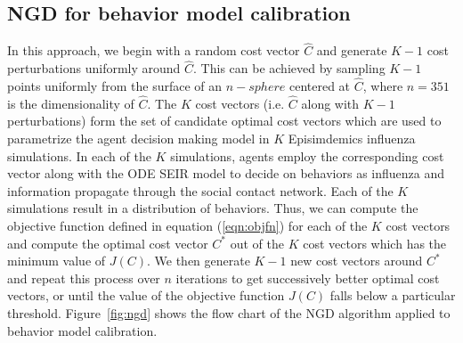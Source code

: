 \documentclass[doublespace,draft]{VTthesis}
\begin{document}
    \subsection{NGD for behavior model calibration} 
    In this approach, we begin with a random cost vector $\hat{C}$ and generate $K-1$ cost perturbations uniformly around $\hat{C}$. This can be achieved by sampling $K-1$ points uniformly from the surface of an $n-sphere$ centered at $\hat{C}$, where $n = 351$ is the dimensionality of $\hat{C}$. The $K$ cost vectors (i.e. $\hat{C}$ along with $K-1$ perturbations) form the set of candidate optimal cost vectors which are used to parametrize the agent decision making model in $K$ Episimdemics influenza simulations. In each of the $K$ simulations, agents employ the corresponding cost vector along with the ODE SEIR model to decide on behaviors as influenza and information propagate through the social contact network. Each of the $K$ simulations result in a distribution of behaviors. Thus, we can compute the objective function defined in equation (\ref{eqn:objfn}) for each of the $K$ cost vectors and compute the optimal cost vector $C^*$ out of the $K$ cost vectors which has the minimum value of $J(C)$. We then generate $K-1$ new cost vectors around $C^*$ and repeat this process over $n$ iterations to get successively better optimal cost vectors, or until the value of the objective function $J(C)$ falls below a particular threshold. Figure~\ref{fig:ngd} shows the flow chart of the NGD algorithm applied to behavior model calibration.
\end{document}
